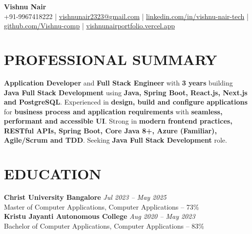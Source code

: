\documentclass[10pt,a4paper]{article}
\begin{document}

\begin{center}

{\Large \textbf{Vishnu Nair}}\\[4pt]

{\small
+91-9967418222
\quad|\quad
\href{mailto:vishnunair2323@gmail.com}{vishnunair2323@gmail.com}
\quad|\quad
\href{https://linkedin.com/in/vishnu-nair-tech}{linkedin.com/in/vishnu-nair-tech}
\quad|\quad
\href{https://github.com/Vishnu-comp}{github.com/Vishnu-comp}
\quad|\quad
\href{https://vishnunairportfolio.vercel.app}{vishnunairportfolio.vercel.app}
}

\end{center}


\section*{PROFESSIONAL SUMMARY}

\small

\textbf{Application Developer} and \textbf{Full Stack Engineer} with \textbf{3 years} building \textbf{Java Full Stack Development} using \textbf{Java, Spring Boot, React.js, Next.js and PostgreSQL}. Experienced in \textbf{design, build and configure applications} for \textbf{business process and application requirements} with \textbf{seamless, performant and accessible UI}. Strong in \textbf{modern frontend practices, RESTful APIs, Spring Boot, Core Java 8+, Azure (Familiar), Agile/Scrum and TDD}. Seeking \textbf{Java Full Stack Development} role.


\section*{EDUCATION}
\small
\textbf{Christ University Bangalore} \hfill \textit{Jul 2023 -- May 2025}\\
Master of Computer Applications, Computer Applications -- 73\%\\
\small
\textbf{Kristu Jayanti Autonomous College} \hfill \textit{Aug 2020 -- May 2023}\\
Bachelor of Computer Applications, Computer Applications -- 83\%
\end{document}
